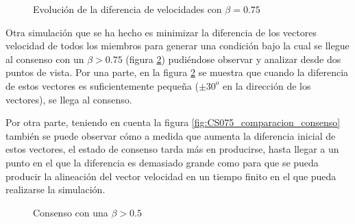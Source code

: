 \begin{figure}[htbp]
\caption{Evolución de la diferencia de velocidades con $\beta=0.75$} 
\label{fig:CS075_vel}
\end{figure}

Otra simulación que se ha hecho es minimizar la diferencia de los vectores velocidad de todos los miembros para generar una condición bajo la cual se llegue al consenso con un $\beta > 0.75$ (figura \ref{fig:CS075_consenso}) pudiéndose observar y analizar desde dos puntos de vista. Por una parte, en la figura \ref{fig:CS075_consenso} se muestra que cuando la diferencia de estos vectores es suficientemente pequeña ($\pm 30^o$ en la dirección de los vectores), se llega al consenso. 

Por otra parte, teniendo en cuenta la figura \ref{fig:CS075_comparacion_consenso} también se puede observar cómo a medida que aumenta la diferencia inicial de estos vectores, el estado de consenso tarda más en producirse, hasta llegar a un punto en el que la diferencia es demasiado grande como para que se pueda producir la alineación del vector velocidad en un tiempo finito en el que pueda realizarse la simulación.

\begin{figure}[htbp]
\centering
\caption{Consenso con una $\beta > 0.5$} 
\label{fig:CS075_consenso}
\end{figure}

